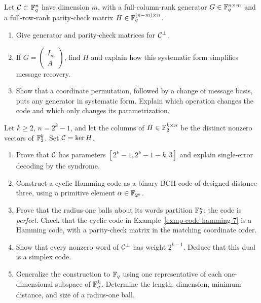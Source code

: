 \begin{exo}
\label{exo-matrices-generator-control}
Let $\mathcal{C}\subset\mathbb{F}_q^n$ have dimension $m$, with a full-column-rank
generator $G\in\mathbb{F}_q^{n\times m}$ and a full-row-rank parity-check
matrix $H\in\mathbb{F}_q^{(n-m)\times n}$.
\begin{enumerate}
\item Give generator and parity-check matrices for $\mathcal{C}^\bot$.
\item If $G=\begin{pmatrix}I_m\\A\end{pmatrix}$, find $H$ and explain
how this systematic form simplifies message recovery.
\item Show that a coordinate permutation, followed by a change of
message basis, puts any generator in systematic form. Explain which
operation changes the code and which only changes its parametrization.
\end{enumerate}
\end{exo}


\begin{exo}
\label{exo-codes-hamming}
Let $k\geq2$, $n=2^k-1$, and let the columns of $H\in\mathbb{F}_2^{k\times n}$
be the distinct nonzero vectors of $\mathbb{F}_2^k$. Set $\mathcal{C}=\ker H$.
\begin{enumerate}
\item Prove that $\mathcal{C}$ has parameters $[2^k-1,2^k-1-k,3]$ and explain
single-error decoding by the syndrome.
\item Construct a cyclic Hamming code as a binary BCH code of designed
distance three, using a primitive element $\alpha\in\mathbb{F}_{2^k}$.
\item Prove that the radius-one balls about its words partition
$\mathbb{F}_2^n$: the code is \emph{perfect}. Check that the cyclic code in
Example~\ref{exmp-code-hamming-7} is a Hamming code, with a parity-check
matrix in the matching coordinate order.
\item Show that every nonzero word of $\mathcal{C}^\bot$ has weight $2^{k-1}$.
Deduce that this dual is a simplex code.
\item Generalize the construction to $\mathbb{F}_q$ using one representative
of each one-dimensional subspace of $\mathbb{F}_q^k$. Determine the length,
dimension, minimum distance, and size of a radius-one ball.
\end{enumerate}
\end{exo}

